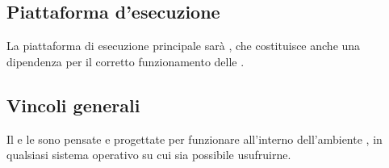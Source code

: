 \subsection{Piattaforma d'esecuzione}
La piattaforma di esecuzione principale sarà , che costituisce anche una dipendenza per il corretto funzionamento delle .


\subsection{Vincoli generali}
Il  e le  sono pensate e progettate per funzionare all'interno dell'ambiente , in qualsiasi sistema operativo su cui sia possibile usufruirne.


